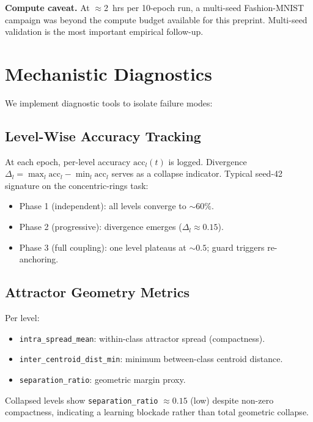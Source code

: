 \documentclass[11pt,a4paper]{article}
\begin{document}
\textbf{Compute caveat.} At $\approx$2~hrs per 10-epoch run, a multi-seed Fashion-MNIST
campaign was beyond the compute budget available for this preprint. Multi-seed
validation is the most important empirical follow-up.

\section{Mechanistic Diagnostics}

We implement diagnostic tools to isolate failure modes:

\subsection{Level-Wise Accuracy Tracking}

At each epoch, per-level accuracy $\mathrm{acc}_l(t)$ is logged. Divergence
$\Delta_l = \max_l \mathrm{acc}_l - \min_l \mathrm{acc}_l$ serves as a collapse indicator.
Typical seed-42 signature on the concentric-rings task:
\begin{itemize}
  \item Phase 1 (independent): all levels converge to $\sim 60\%$.
  \item Phase 2 (progressive): divergence emerges ($\Delta_l \approx 0.15$).
  \item Phase 3 (full coupling): one level plateaus at $\sim 0.5$; guard triggers
        re-anchoring.
\end{itemize}

\subsection{Attractor Geometry Metrics}

Per level:
\begin{itemize}
  \item \texttt{intra\_spread\_mean}: within-class attractor spread (compactness).
  \item \texttt{inter\_centroid\_dist\_min}: minimum between-class centroid distance.
  \item \texttt{separation\_ratio}: geometric margin proxy.
\end{itemize}
Collapsed levels show \texttt{separation\_ratio} $\approx 0.15$ (low) despite non-zero
compactness, indicating a learning blockade rather than total geometric collapse.
\end{document}
